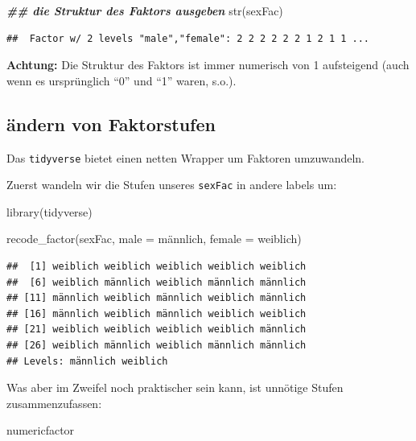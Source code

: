 \documentclass[
]{book}
\newenvironment{Shaded}{\begin{snugshade}}{\end{snugshade}}
\newcommand{\AttributeTok}[1]{\textcolor[rgb]{0.77,0.63,0.00}{#1}}
\newcommand{\DocumentationTok}[1]{\textcolor[rgb]{0.56,0.35,0.01}{\textbf{\textit{#1}}}}
\newcommand{\FunctionTok}[1]{\textcolor[rgb]{0.00,0.00,0.00}{#1}}
\newcommand{\NormalTok}[1]{#1}
\newcommand{\StringTok}[1]{\textcolor[rgb]{0.31,0.60,0.02}{#1}}
\begin{document}
\begin{Shaded}
\begin{Highlighting}[]
\DocumentationTok{\#\# die Struktur des Faktors ausgeben}
\FunctionTok{str}\NormalTok{(sexFac)  }
\end{Highlighting}
\end{Shaded}

\begin{verbatim}
##  Factor w/ 2 levels "male","female": 2 2 2 2 2 2 1 2 1 1 ...
\end{verbatim}

\textbf{Achtung:} Die Struktur des Faktors ist immer numerisch von 1 aufsteigend (auch wenn es ursprünglich ``0'' und ``1'' waren, s.o.).

\hypertarget{uxe4ndern-von-faktorstufen}{%
\subsection{ändern von Faktorstufen}\label{uxe4ndern-von-faktorstufen}}

Das \texttt{tidyverse} bietet einen netten Wrapper um Faktoren umzuwandeln.

Zuerst wandeln wir die Stufen unseres \texttt{sexFac} in andere labels um:

\begin{Shaded}
\begin{Highlighting}[]
\FunctionTok{library}\NormalTok{(tidyverse)}

\FunctionTok{recode\_factor}\NormalTok{(sexFac,}
              \AttributeTok{male =} \StringTok{\textquotesingle{}männlich\textquotesingle{}}\NormalTok{,}
              \AttributeTok{female =} \StringTok{\textquotesingle{}weiblich\textquotesingle{}}\NormalTok{)}
\end{Highlighting}
\end{Shaded}

\begin{verbatim}
##  [1] weiblich weiblich weiblich weiblich weiblich
##  [6] weiblich männlich weiblich männlich männlich
## [11] männlich weiblich männlich weiblich männlich
## [16] männlich weiblich männlich weiblich weiblich
## [21] weiblich weiblich weiblich weiblich männlich
## [26] weiblich männlich weiblich männlich männlich
## Levels: männlich weiblich
\end{verbatim}

Was aber im Zweifel noch praktischer sein kann, ist unnötige Stufen zusammenzufassen:

\begin{Shaded}
\begin{Highlighting}[]
\NormalTok{numericfactor}
\end{Highlighting}
\end{Shaded}
\end{document}

